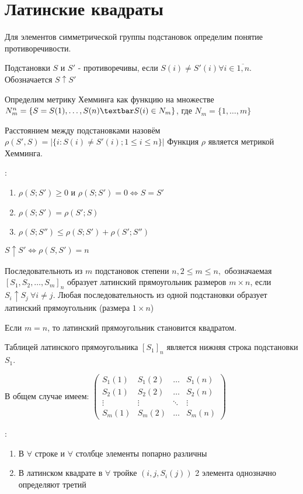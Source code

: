 \section{Латинские квадраты}

Для элементов симметрической группы подстановок определим понятие противоречивости.\par
\opr Подстановки $S$ и $S'$ - противоречивы, если $S(i) \neq S'(i) \forall i \in \overline{1,n}$. Обозначается $S\uparrow S'$

Определим метрику Хемминга как функцию на множестве $N_m^n = \{ S = S(1), \dotsc,S(n) \textbar S(i) \in N_m\}$, где $N_m = \{1, \dotsc, m\}$\par
Расстоянием между подстановками назовём $\rho(S',S) = |\{i : S(i) \neq S'(i); 1 \leq i \leq n\}|$
Функция $\rho$ является метрикой Хемминга.

\prop:
\begin{enumerate}
	\item $\rho(S;S') \geq 0$ и $\rho(S;S') = 0 \Leftrightarrow S = S'$
	\item $\rho(S;S') = \rho(S';S)$
	\item $\rho(S;S'') \leq \rho(S;S') + \rho(S';S'')$
\end{enumerate}

\utv $S \uparrow S' \Leftrightarrow \rho(S,S')=n$

\opr Последовательноть из $m$ подстановок степени $n, 2\leq m\leq n,$ обозначаемая $[S_1, S_2, \dotsc, S_m]_n$ образует латинский прямоугольник размеров $m\times n$, если $S_i\uparrow S_j \:\forall i\neq j$. Любая последовательность из одной подстановки образует латинский прямоугольник (размера $1\times n$)\par
Если $m=n$, то латинский прямоугольник становится квадратом.

Таблицей латинского прямоугольника $[S_1]_n$ является нижняя строка подстановки $S_1$. \par
В общем случае имеем:
$\begin{pmatrix}
S_1(1) & S_1(2) & \dotsc & S_1(n)\\
S_2(1) & S_2(2) & \dotsc & S_2(n)\\
\vdots & \vdots  & \ddots   & \vdots  \\
S_m(1) & S_m(2) & \dotsc & S_m(n)
\end{pmatrix}$\par
\prop:
\begin{enumerate}
	\item В $\forall$ строке и $\forall$ столбце элементы попарно различны
	\item В латинском квадрате в $\forall$ тройке $(i, j, S_i(j))$ 2 элемента однозначно определяют третий
\end{enumerate}


